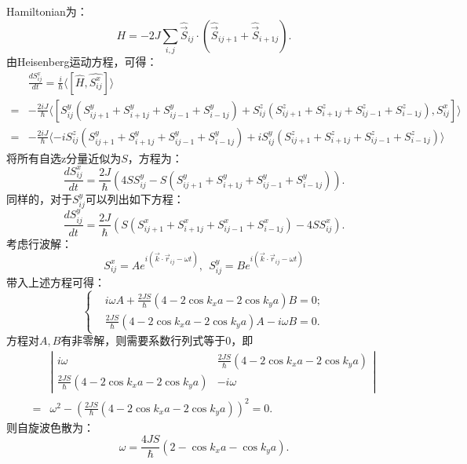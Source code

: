 \documentclass[reqno,a4paper,12pt]{amsart}
\begin{document}
\begin{enumerate}[1]
\begin{tcolorbox}[colback = black!5!white, colframe = black, breakable]
Hamiltonian为：
\[
	H = -2J \sum_{i,j} \hat{\vec{S}}_{ij} \cdot (\hat{\vec{S}}_{ij+1} + \hat{\vec{S}}_{i+1j}).
\]
由Heisenberg运动方程，可得：
\begin{align*}
	&\frac{dS_{ij}^x}{dt} = \frac{i}{\hbar} \langle [\hat{H}, \hat{S_{ij}^x}] \rangle \\
	=& -\frac{2iJ}{\hbar} \langle [S_{ij}^y (S_{ij+1}^y + S_{i+1j}^y + S_{ij-1}^y + S_{i-1j}^y) + S_{ij}^z (S_{ij+1}^z + S_{i+1j}^z + S_{ij-1}^z + S_{i-1j}^z), S_{ij}^x] \rangle \\
	=& -\frac{2iJ}{\hbar} \langle -iS_{ij}^z(S_{ij+1}^y + S_{i+1j}^y + S_{ij-1}^y + S_{i-1j}^y) + iS_{ij}^y (S_{ij+1}^z + S_{i+1j}^z + S_{ij-1}^z + S_{i-1j}^z) \rangle
\end{align*}
将所有自选z分量近似为$S$，方程为：
\[
	\frac{dS_{ij}^x}{dt} = \frac{2J}{\hbar}(4S S_{ij}^y - S(S_{ij+1}^y + S_{i+1j}^y + S_{ij-1}^y + S_{i-1j}^y)).
\]
同样的，对于$S_{ij}^y$可以列出如下方程：
\[
	\frac{dS_{ij}^y}{dt} = \frac{2J}{\hbar}(S(S_{ij+1}^x + S_{i+1j}^x + S_{ij-1}^x + S_{i-1j}^x) -4S S_{ij}^x).
\]
考虑行波解：
\[
	S_{ij}^x = A e^{i(\vec{k}\cdot\vec{r}_{ij}-\omega t)}, ~~ S_{ij}^y = B e^{i(\vec{k}\cdot\vec{r}_{ij}-\omega t)}
\]
带入上述方程可得：
\[\left\{
\begin{aligned}
	&i\omega A + \frac{2JS}{\hbar}(4-2\cos k_xa-2\cos k_ya) B = 0; \\
	&\frac{2JS}{\hbar}(4-2\cos k_xa-2\cos k_ya) A - i\omega B = 0.
\end{aligned}\right.
\]
方程对$A,B$有非零解，则需要系数行列式等于0，即
\begin{align*}
	&\left\vert \begin{matrix}
		i\omega & \frac{2JS}{\hbar}(4-2\cos k_xa-2\cos k_ya) \\
		\frac{2JS}{\hbar}(4-2\cos k_xa-2\cos k_ya) & -i\omega
	\end{matrix} \right\vert \\
	=& \omega^2-\left( \frac{2JS}{\hbar}(4-2\cos k_xa-2\cos k_ya) \right)^2 = 0.
\end{align*}
则自旋波色散为：
\[
	\omega = \frac{4JS}{\hbar}(2-\cos k_xa-\cos k_ya).
\]
\end{tcolorbox}

\end{enumerate}
\end{document}
